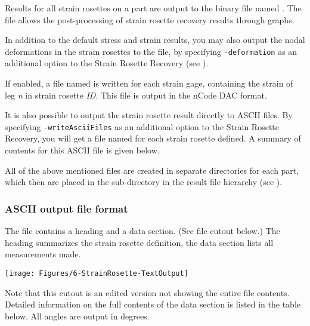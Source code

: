 
Results for all strain rosettes on a part are output to the binary 
file named .
The  file allows the post-processing of strain rosette recovery
results through graphs.

In addition to the default stress and strain results, you may also output the
nodal deformations in the strain rosettes to the  file, by specifying
{\tt-deformation} as an additional option to the Strain Rosette Recovery
(see ).

If enabled, a file named  is written
for each strain gage, containing the strain of leg {\sl n} in strain rosette
{\sl ID}. This file is output in the nCode DAC format.

It is also possible to output the strain rosette result directly to ASCII files.
By specifying {\tt-writeAsciiFiles} as an additional option to the
Strain Rosette Recovery, you will get a file named
 for each strain rosette defined.
A summary of contents for this ASCII file is given below.

All of the above mentioned files are created in separate directories for each
part, which then are placed in the sub-directory
 in the result file hierarchy
(see ).

\subsubsection{ASCII output file format}

The  file contains a heading and a data section.
(See file cutout below.) The heading summarizes the strain rosette definition,
the data section lists all measurements made.

\begin{center}
  \texttt{[image: Figures/6-StrainRosette-TextOutput]}
\end{center}

\clearpage
Note that this cutout is an edited version not showing the entire file contents.
Detailed information on the full contents of the data section is listed
in the table below. All angles are output in degrees.

